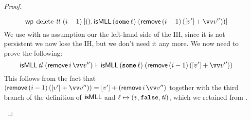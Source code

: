 \documentclass[thesis.tex]{subfiles}
\begin{document}
\begin{proof}
\begin{description}
\begin{description}
          \[
            \wpre{\MLLdelete\,\langv{tl}\ (\iindex - 1)}{\Ret(). \textlog{isMLL}\, (\Some \loc)\; (\textlog{remove}\, (\iindex - 1)\, ([\val'] + \vect{\val}''))}
          \]
          We use  with as assumption our the left-hand side of the IH, since it is not persistent we now lose the IH, but we don't need it any more. We now need to prove the following:
          \[\textlog{isMLL}\, \langv{tl}\; (\textlog{remove}\, \iindex\, \vect{\val}'') \proves \textlog{isMLL}\, (\Some \loc)\; (\textlog{remove}\, (\iindex - 1)\, ([\val'] + \vect{\val}''))\]
          This follows from the fact that $(\textlog{remove}\, (\iindex - 1)\, ([\val'] + \vect{\val}'')) = [\val'] + (\textlog{remove}\, \iindex\, \vect{\val}'')$ together with the third branch of the definition of $\textsf{\upshape isMLL}$ and $\loc \fmapsto (\val, \False, \langv{tl})$, which we retained from .
      \end{description}
  \end{description}

\end{proof}
\end{document}
